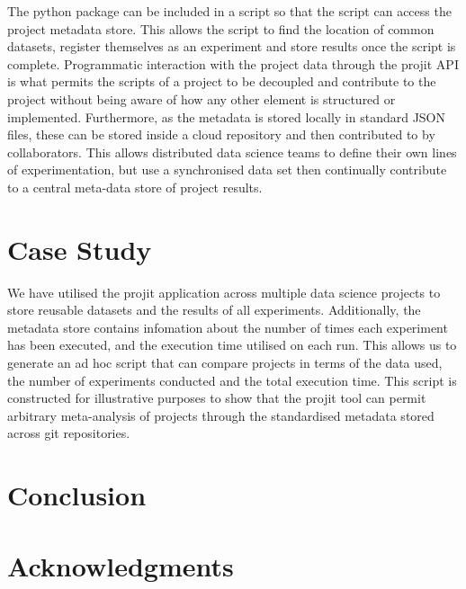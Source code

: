 \documentclass[sigconf]{acmart}
\begin{document}
The python package can be included in a script so that the script can access the project metadata store.
This allows the script to find the location of common datasets, register themselves as an experiment
and store results once the script is complete. Programmatic interaction with the project data through
the projit API is what permits the scripts of a project to be decoupled and contribute to the project
without being aware of how any other element is structured or implemented. Furthermore, as the metadata
is stored locally in standard JSON files, these can be stored inside a cloud repository and then contributed
to by collaborators. This allows distributed data science teams to define their own lines of experimentation,
but use a synchronised data set then continually contribute to a central meta-data store of project results.


\section{Case Study}

We have utilised the projit application across multiple data science projects to store reusable datasets
and the results of all experiments. Additionally, the metadata store contains infomation about the number
of times each experiment has been executed, and the execution time utilised on each run. This allows us
to generate an ad hoc script that can compare projects in terms of the data used, the number of experiments
conducted and the total execution time. This script is constructed for illustrative purposes to show that
the projit tool can permit arbitrary meta-analysis of projects through the standardised metadata stored across
git repositories.


\section{Conclusion}


\section{Acknowledgments}



\end{document}
